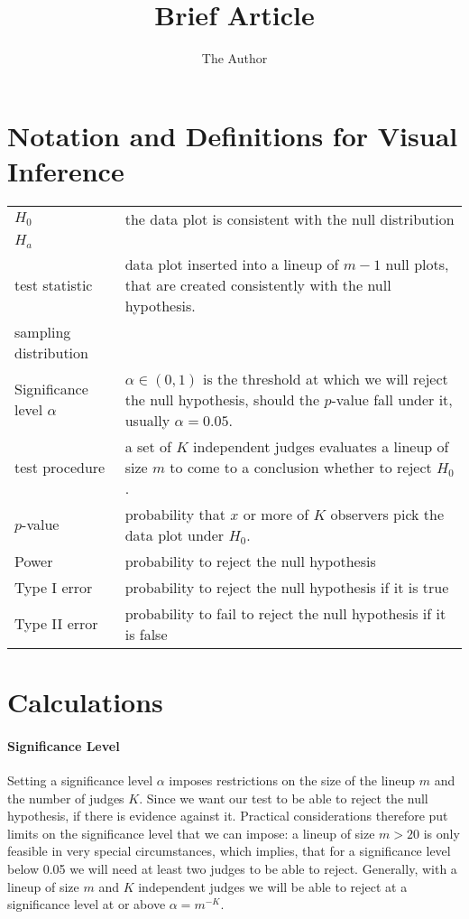 \documentclass[11pt]{article}
\title{Brief Article}
\author{The Author}
\begin{document}
\section{Notation and Definitions for Visual Inference}


\begin{tabular}{lp{4in}}
$H_0$ & the data plot is consistent with the null distribution \\
$H_a$ & \\
test statistic & data plot inserted into a lineup of $m-1$ null plots, that are created consistently with the null hypothesis.\\
sampling distribution & \\
Significance level $\alpha$ & $\alpha \in (0,1)$ is the threshold at which we will reject the null hypothesis, should the $p$-value fall under it, usually $\alpha=0.05$.\\
test procedure & a set of $K$ independent judges evaluates a lineup of size $m$ to come to a conclusion whether to reject $H_0$.\\
$p$-value & probability that $x$ or more of $K$ observers pick the data plot  under $H_0$. \\
Power & probability to reject the null hypothesis\\
Type I error & probability to reject the null hypothesis if it is true\\
Type II error & probability to fail to reject the null hypothesis if it is false\\
\end{tabular}

\section{Calculations}
\paragraph{Significance Level}
Setting a significance level $\alpha$ imposes restrictions on the size of the lineup $m$ and the number of judges $K$. Since we want our test to be able to reject the null hypothesis, if there is evidence against it. Practical considerations therefore put limits on the significance level that we can impose: a lineup of size $m > 20$ is only feasible in very special circumstances, which implies, that for a significance level below 0.05 we will need at least two judges to be able to reject. Generally, with a lineup of size $m$ and $K$ independent judges we will be able to reject at a significance level at or above $\alpha = m^{-K}$.
\end{document}
